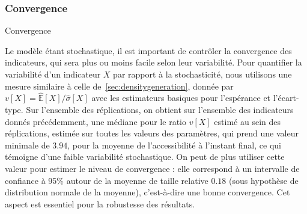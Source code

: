 \subsubsection{Convergence}{Convergence}


Le modèle étant stochastique, il est important de contrôler la convergence des indicateurs, qui sera plus ou moins facile selon leur variabilité. Pour quantifier la variabilité d'un indicateur $X$ par rapport à la stochasticité, nous utilisons une mesure similaire à celle de~\ref{sec:densitygeneration}, donnée par $v\left[X\right] = \hat{\mathbb{E}}\left[X\right]/\hat{\sigma}\left[X\right]$ avec les estimateurs basiques pour l'espérance et l'écart-type. Sur l'ensemble des réplications, on obtient sur l'ensemble des indicateurs donnés précédemment, une médiane pour le ratio $v\left[X\right]$ estimé au sein des réplications, estimée sur toutes les valeurs des paramètres, qui prend une valeur minimale de $3.94$, pour la moyenne de l'accessibilité à l'instant final, ce qui témoigne d'une faible variabilité stochastique. On peut de plus utiliser cette valeur pour estimer le niveau de convergence : elle correspond à un intervalle de confiance à 95\% autour de la moyenne de taille relative $0.18$ (sous hypothèse de distribution normale de la moyenne), c'est-à-dire une bonne convergence. Cet aspect est essentiel pour la robustesse des résultats.




